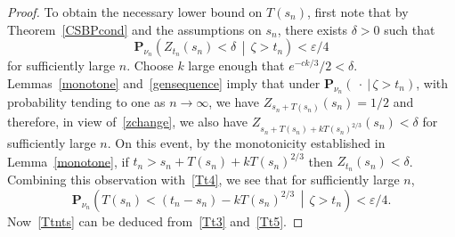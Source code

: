 \documentclass[10pt]{amsart}
\theoremstyle{definition}\newtheorem{defi}[theo]{Definition}\newtheorem{rema}[theo]{Remark}\newtheorem{exam}[theo]{Example}\newtheorem{exem}[theo]{Example}\newtheorem{nota}[theo]{Notation}
\newcommand*\eps{\varepsilon}
\renewcommand*\P{\mathbf{P}}
\newcommand{\1} {\mathds{1}}
\begin{document}
\begin{proof}
To obtain the necessary lower bound on $T(s_n)$, first note that by Theorem~\ref{CSBPcond} and the assumptions on $s_n$, there exists $\delta > 0$ such that
\begin{equation}\label{Tt4}
\P_{\nu_n}\left(Z_{t_n}(s_n) < \delta\,\middle|\,\zeta > t_n\right) < \eps/4
\end{equation}
for sufficiently large $n$. Choose $k$ large enough that $e^{-ck/3}/2 < \delta$. Lemmas~\ref{monotone} and~\ref{gensequence} imply that under $\P_{\nu_n}(\: \cdot \: |\, \zeta > t_n)$, with probability tending to one as $n \rightarrow \infty$, we have $Z_{s_n + T(s_n)}(s_n) = 1/2$ and therefore, in view of~\eqref{zchange}, we also have $Z_{s_n + T(s_n) + kT(s_n)^{2/3}}(s_n) < \delta$ for sufficiently large $n$. On this event, by the monotonicity established in Lemma~\ref{monotone}, if $t_n > s_n + T(s_n) + kT(s_n)^{2/3}$ then $Z_{t_n}(s_n) < \delta$. Combining this observation with~\eqref{Tt4}, we see that for sufficiently large $n$,
\begin{equation}\label{Tt5}
\P_{\nu_n}\left(T(s_n) < (t_n - s_n) - kT(s_n)^{2/3} \,\middle|\, \zeta > t_n\right) < \eps/4.
\end{equation}
Now~\eqref{Ttnts} can be deduced from~\eqref{Tt3} and~\eqref{Tt5}.
\end{proof}
\end{document}
